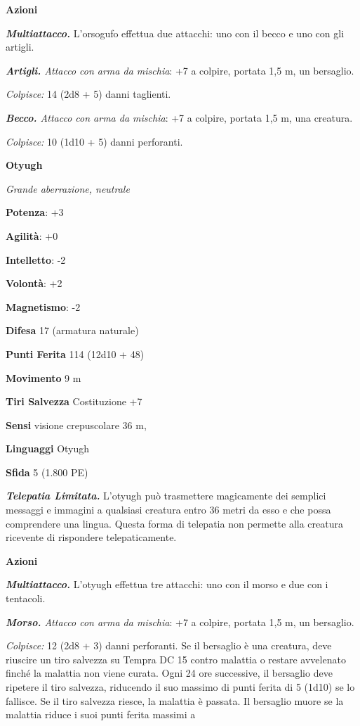 \begin{multicols}{2}
\textbf{Azioni}

\emph{\textbf{Multiattacco.}} L'orsogufo effettua due attacchi: uno con
il becco e uno con gli artigli.

\emph{\textbf{Artigli.} Attacco con arma da mischia}: +7 a colpire,
portata 1,5 m, un bersaglio.

\emph{Colpisce:} 14 (2d8 + 5) danni taglienti.

\emph{\textbf{Becco.} Attacco con arma da mischia}: +7 a colpire,
portata 1,5 m, una creatura.

\emph{Colpisce:} 10 (1d10 + 5) danni perforanti.


\textbf{Otyugh}

\emph{Grande aberrazione, neutrale}

\textbf{Potenza}: +3

\textbf{Agilità}: +0

\textbf{Intelletto}: -2

\textbf{Volontà}: +2

\textbf{Magnetismo}: -2

\textbf{Difesa} 17 (armatura naturale)

\textbf{Punti Ferita} 114 (12d10 + 48)

\textbf{Movimento} 9 m

\textbf{Tiri Salvezza} Costituzione +7

\textbf{Sensi} visione crepuscolare 36 m, 

\textbf{Linguaggi} Otyugh

\textbf{Sfida} 5 (1.800 PE)

\emph{\textbf{Telepatia Limitata.}} L'otyugh può trasmettere magicamente
dei semplici messaggi e immagini a qualsiasi creatura entro 36 metri da
esso e che possa comprendere una lingua. Questa forma di telepatia non
permette alla creatura ricevente di rispondere telepaticamente.

\textbf{Azioni}

\emph{\textbf{Multiattacco.}} L'otyugh effettua tre attacchi: uno con il
morso e due con i tentacoli.

\emph{\textbf{Morso.} Attacco con arma da mischia}: +7 a colpire,
portata 1,5 m, un bersaglio.

\emph{Colpisce:} 12 (2d8 + 3) danni perforanti. Se il bersaglio è una
creatura, deve riuscire un tiro salvezza su Tempra DC 15 contro
malattia o restare avvelenato finché la malattia non viene curata. Ogni
24 ore successive, il bersaglio deve ripetere il tiro salvezza,
riducendo il suo massimo di punti ferita di 5 (1d10) se lo fallisce. Se
il tiro salvezza riesce, la malattia è passata. Il bersaglio muore se la
malattia riduce i suoi punti ferita massimi a



\end{multicols}

